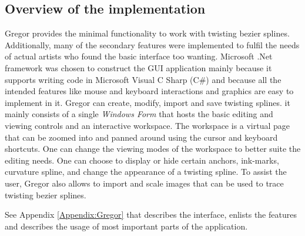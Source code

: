 \subsection{Overview of the implementation}
{
    Gregor provides the minimal functionality to work with twisting bezier splines. Additionally, many of the secondary features were implemented to fulfil the needs of actual artists who found the basic interface too wanting. Microsoft .Net framework was chosen to construct the GUI application mainly because it supports writing code in Microsoft Visual C Sharp (C\#) and because all the intended features like mouse and keyboard interactions and graphics are easy to implement in it. Gregor can create, modify, import and save twisting splines. it mainly consists of a single \emph{Windows Form} that hosts the basic editing and viewing controls and an interactive workspace. The workspace is a virtual page that can be zoomed into and panned around using the cursor and keyboard shortcuts. One can change the viewing modes of the workspace to better suite the editing needs. One can choose to display or hide certain anchors, ink-marks, curvature spline, and change the appearance of a twisting spline. To assist the user, Gregor also allows to import and scale images that can be used to trace twisting bezier splines.
    
    See Appendix \ref{Appendix:Gregor} that describes the interface, enlists the features and describes the usage of most important parts of the application.
}
\clearpage
